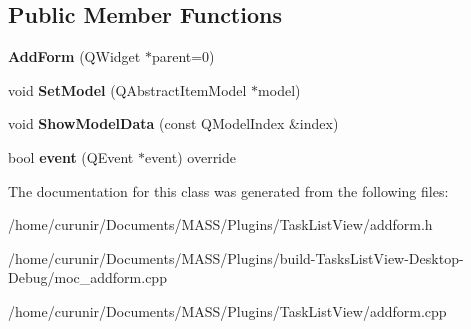 \subsection*{Public Member Functions}
\begin{DoxyCompactItemize}
\item 
{\bfseries Add\+Form} (Q\+Widget $\ast$parent=0)\hypertarget{class_add_form_a623e493b6c6cb526d2a624010fe6efca}{}\label{class_add_form_a623e493b6c6cb526d2a624010fe6efca}

\item 
void {\bfseries Set\+Model} (Q\+Abstract\+Item\+Model $\ast$model)\hypertarget{class_add_form_a2edb1f6faa703e3f5129bb91907964d1}{}\label{class_add_form_a2edb1f6faa703e3f5129bb91907964d1}

\item 
void {\bfseries Show\+Model\+Data} (const Q\+Model\+Index \&index)\hypertarget{class_add_form_a8d77f148efbb818939d10821e6a3c6fd}{}\label{class_add_form_a8d77f148efbb818939d10821e6a3c6fd}

\item 
bool {\bfseries event} (Q\+Event $\ast$event) override\hypertarget{class_add_form_a488387f47577f8742c920e761e9e2c63}{}\label{class_add_form_a488387f47577f8742c920e761e9e2c63}

\end{DoxyCompactItemize}


The documentation for this class was generated from the following files\+:\begin{DoxyCompactItemize}
\item 
/home/curunir/\+Documents/\+M\+A\+S\+S/\+Plugins/\+Task\+List\+View/addform.\+h\item 
/home/curunir/\+Documents/\+M\+A\+S\+S/\+Plugins/build-\/\+Tasks\+List\+View-\/\+Desktop-\/\+Debug/moc\+\_\+addform.\+cpp\item 
/home/curunir/\+Documents/\+M\+A\+S\+S/\+Plugins/\+Task\+List\+View/addform.\+cpp\end{DoxyCompactItemize}
